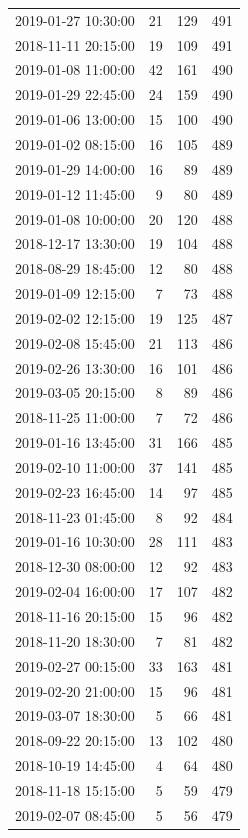 \begin{tabular}{lrrr}
2019-01-27 10:30:00 & 21 & 129 & 491 \\
2018-11-11 20:15:00 & 19 & 109 & 491 \\
2019-01-08 11:00:00 & 42 & 161 & 490 \\
2019-01-29 22:45:00 & 24 & 159 & 490 \\
2019-01-06 13:00:00 & 15 & 100 & 490 \\
2019-01-02 08:15:00 & 16 & 105 & 489 \\
2019-01-29 14:00:00 & 16 & 89 & 489 \\
2019-01-12 11:45:00 & 9 & 80 & 489 \\
2019-01-08 10:00:00 & 20 & 120 & 488 \\
2018-12-17 13:30:00 & 19 & 104 & 488 \\
2018-08-29 18:45:00 & 12 & 80 & 488 \\
2019-01-09 12:15:00 & 7 & 73 & 488 \\
2019-02-02 12:15:00 & 19 & 125 & 487 \\
2019-02-08 15:45:00 & 21 & 113 & 486 \\
2019-02-26 13:30:00 & 16 & 101 & 486 \\
2019-03-05 20:15:00 & 8 & 89 & 486 \\
2018-11-25 11:00:00 & 7 & 72 & 486 \\
2019-01-16 13:45:00 & 31 & 166 & 485 \\
2019-02-10 11:00:00 & 37 & 141 & 485 \\
2019-02-23 16:45:00 & 14 & 97 & 485 \\
2018-11-23 01:45:00 & 8 & 92 & 484 \\
2019-01-16 10:30:00 & 28 & 111 & 483 \\
2018-12-30 08:00:00 & 12 & 92 & 483 \\
2019-02-04 16:00:00 & 17 & 107 & 482 \\
2018-11-16 20:15:00 & 15 & 96 & 482 \\
2018-11-20 18:30:00 & 7 & 81 & 482 \\
2019-02-27 00:15:00 & 33 & 163 & 481 \\
2019-02-20 21:00:00 & 15 & 96 & 481 \\
2019-03-07 18:30:00 & 5 & 66 & 481 \\
2018-09-22 20:15:00 & 13 & 102 & 480 \\
2018-10-19 14:45:00 & 4 & 64 & 480 \\
2018-11-18 15:15:00 & 5 & 59 & 479 \\
2019-02-07 08:45:00 & 5 & 56 & 479 \\

\end{tabular}
